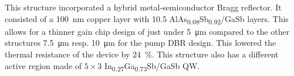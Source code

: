 This structure incorporated a hybrid metal-semiconductor Bragg reflector. It consisted of a  \qty{100}{\nm} copper layer with 10.5 AlAs\textsubscript{0.08}Sb\textsubscript{0.92}/GaSb layers. This allows for a thinner gain chip design of just under \qty{5}{\um} compared to the other structures \qty{7.5}{\um} resp. \qty{10}{\um} for the pump DBR design. This lowered the thermal resistance of the device by \qty{24}{\percent}. This structure also has a different active region made of $5\times3$ In\textsubscript{0.27}Ga\textsubscript{0.73}Sb/GaSb QW.